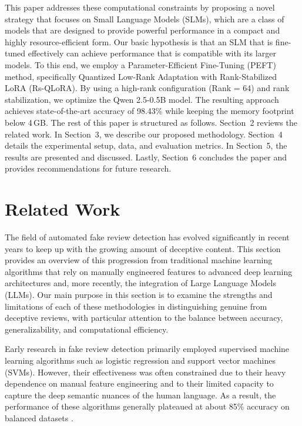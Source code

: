 \documentclass[utf8]{FrontiersinHarvard}
\begin{document}
This paper addresses these computational constraints by proposing a novel strategy that focuses on Small Language Models (SLMs), which are a class of models that are designed to provide powerful performance in a compact and highly resource-efficient form. Our basic hypothesis is that an SLM that is fine-tuned effectively can achieve performance that is compatible with its larger models. To this end, we employ a Parameter-Efficient Fine-Tuning (PEFT) method, specifically Quantized Low-Rank Adaptation with Rank-Stabilized LoRA (Rs-QLoRA). By using a high-rank configuration (Rank = 64) and rank stabilization, we optimize the Qwen 2.5-0.5B model. The resulting approach achieves state-of-the-art accuracy of 98.43\% while keeping the memory footprint below 4\,GB. The rest of this paper is structured as follows. Section~2 reviews the related work. In Section~3, we describe our proposed methodology. Section~4 details the experimental setup, data, and evaluation metrics. In Section~5, the results are presented and discussed. Lastly, Section~6 concludes the paper and provides recommendations for future research.



\section{Related Work}

The field of automated fake review detection has evolved significantly in recent years to keep up with the growing amount of deceptive content. This section provides an overview of this progression from traditional machine learning algorithms that rely on manually engineered features to advanced deep learning architectures and, more recently, the integration of Large Language Models (LLMs). Our main purpose in this section is to examine the strengths and limitations of each of these methodologies in distinguishing genuine from deceptive reviews, with particular attention to the balance between accuracy, generalizability, and computational efficiency.

Early research in fake review detection primarily employed supervised machine learning algorithms such as logistic regression and support vector machines (SVMs). However, their effectiveness was often constrained due to their heavy dependence on manual feature engineering and to their limited capacity to capture the deep semantic nuances of the human language. As a result, the performance of these algorithms generally plateaued at about 85\% accuracy on balanced datasets \citep{Salminen2022}.
\end{document}
